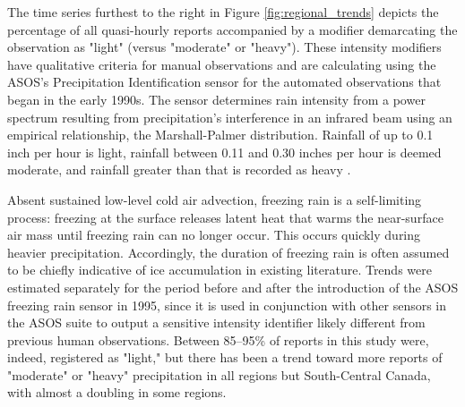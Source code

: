 \documentclass[twocol]{ametsoc}
\begin{document}
The time series furthest to the right in Figure \ref{fig:regional_trends} depicts the percentage of all quasi-hourly reports accompanied by a modifier demarcating the observation as "light" (versus "moderate" or "heavy"). These intensity modifiers have qualitative criteria for manual observations and are calculating using the ASOS's Precipitation Identification sensor for the automated observations that began in the early 1990s. The sensor determines rain intensity from a power spectrum resulting from precipitation's interference in an infrared beam using an empirical relationship, the Marshall-Palmer distribution. Rainfall of up to 0.1 inch per hour is light, rainfall between 0.11 and 0.30 inches per hour is deemed moderate, and rainfall greater than that is recorded as heavy \citep{asos1998}. 

Absent sustained low-level cold air advection, freezing rain is a self-limiting process: freezing at the surface releases latent heat that warms the near-surface air mass until freezing rain can no longer occur. This occurs quickly during heavier precipitation. Accordingly, the duration of freezing rain is often assumed to be chiefly indicative of ice accumulation in existing literature.  Trends were estimated separately for the period before and after the introduction of the ASOS freezing rain sensor in 1995, since it is used in conjunction with other sensors in the ASOS suite to output a sensitive intensity identifier likely different from previous human observations. Between 85--95\% of reports in this study were, indeed, registered as "light," but there has been a trend toward more reports of "moderate" or "heavy" precipitation in all regions but South-Central Canada, with almost a doubling in some regions.
\end{document}
